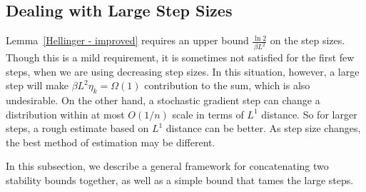 \documentclass[final,12pt]{colt2018} %
\begin{document}
\subsection{Dealing with Large Step Sizes}
Lemma~\ref{Hellinger - improved} requires an upper bound $\frac{\ln 2}{\beta L^2}$ on the step sizes. Though this is a mild requirement, it is sometimes not satisfied for the first few steps, when we are using decreasing step sizes. In this situation, however, a large step will make $\beta L^2\eta_k=\Omega(1)$ contribution to the sum, which is also undesirable. On the other hand, a stochastic gradient step can change a distribution within at most $O(1/n)$ scale in terms of $L^1$ distance. So for larger steps, a rough estimate based on $L^1$ distance can be better. As step size changes, the best method of estimation may be different.

In this subsection, we describe a general framework for concatenating two stability bounds together, as well as a simple bound that tames the large steps.
\end{document}
